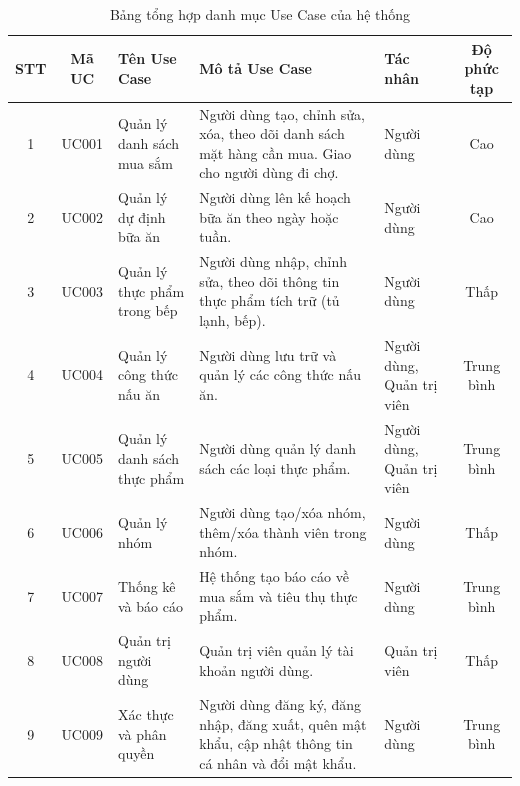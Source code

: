 \begin{table}[H]
    \centering
    \footnotesize %
    \renewcommand{\arraystretch}{1.5}
    \setlength{\tabcolsep}{3pt} %
    
    \begin{tabularx}{\textwidth}{|c|c|>{\RaggedRight\arraybackslash}p{2.5cm}|X|>{\RaggedRight\arraybackslash}p{2.2cm}|c|}
        \hline
        \rowcolor{gray!20} 
        \textbf{STT} & \textbf{Mã UC} & \textbf{Tên Use Case} & \textbf{Mô tả Use Case} & \textbf{Tác nhân} & \textbf{Độ phức tạp} \\ \hline
        
        1 & UC001 & Quản lý danh sách mua sắm & Người dùng tạo, chỉnh sửa, xóa, theo dõi danh sách mặt hàng cần mua. Giao cho người dùng đi chợ. & Người dùng & Cao \\ \hline
        
        2 & UC002 & Quản lý dự định bữa ăn & Người dùng lên kế hoạch bữa ăn theo ngày hoặc tuần. & Người dùng & Cao \\ \hline
        
        3 & UC003 & Quản lý thực phẩm trong bếp & Người dùng nhập, chỉnh sửa, theo dõi thông tin thực phẩm tích trữ (tủ lạnh, bếp). & Người dùng & Thấp \\ \hline
        
        4 & UC004 & Quản lý công thức nấu ăn & Người dùng lưu trữ và quản lý các công thức nấu ăn. & Người dùng, Quản trị viên & Trung bình \\ \hline
        
        5 & UC005 & Quản lý danh sách thực phẩm & Người dùng quản lý danh sách các loại thực phẩm. & Người dùng, Quản trị viên & Trung bình \\ \hline
        
        6 & UC006 & Quản lý nhóm & Người dùng tạo/xóa nhóm, thêm/xóa thành viên trong nhóm. & Người dùng & Thấp \\ \hline
        
        7 & UC007 & Thống kê và báo cáo & Hệ thống tạo báo cáo về mua sắm và tiêu thụ thực phẩm. & Người dùng & Trung bình \\ \hline
        
        8 & UC008 & Quản trị người dùng & Quản trị viên quản lý tài khoản người dùng. & Quản trị viên & Thấp \\ \hline
        
        9 & UC009 & Xác thực và phân quyền & Người dùng đăng ký, đăng nhập, đăng xuất, quên mật khẩu, cập nhật thông tin cá nhân và đổi mật khẩu. & Người dùng & Trung bình \\ \hline
    \end{tabularx}
    \caption{Bảng tổng hợp danh mục Use Case của hệ thống}
    \label{tab:danh-muc-usecase}
\end{table}
